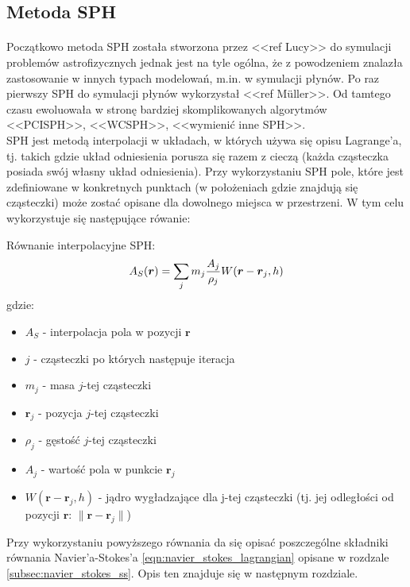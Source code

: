 \subsection{Metoda SPH}
\paragraph{}
Początkowo metoda SPH została stworzona przez <<ref Lucy>> do symulacji problemów astrofizycznych jednak jest na tyle ogólna, że z powodzeniem znalazła zastosowanie w innych typach modelowań, m.in. w symulacji płynów. Po raz pierwszy SPH do symulacji płynów wykorzystał <<ref Müller>>. Od tamtego czasu ewoluowała w stronę bardziej skomplikowanych algorytmów <<PCISPH>>, <<WCSPH>>, <<wymienić inne SPH>>.\\
SPH jest metodą interpolacji w układach, w których używa się opisu Lagrange'a, tj. takich gdzie układ odniesienia porusza się razem z cieczą (każda cząsteczka posiada swój własny układ odniesienia). Przy wykorzystaniu SPH pole, które jest zdefiniowane w konkretnych punktach (w położeniach gdzie znajdują się cząsteczki) może zostać opisane dla dowolnego miejsca w przestrzeni. W tym celu wykorzystuje się następujące rówanie:\\

\begin{samepage}
{\sc Równanie interpolacyjne SPH: }
\begin{equation}
A_S(\boldsymbol{r}) = \sum\limits_{j} m_j {A_j \over\rho_j}W(\boldsymbol{r}-\boldsymbol{r}_j, h)
\label{eqn:sph}
\end{equation}
gdzie:

\begin{itemize}[noitemsep,topsep=0pt,parsep=0pt,partopsep=0pt]
\renewcommand\labelitemi{--}
\item $ A_S $ - interpolacja pola w pozycji $\boldsymbol{r}$
\item $j$ - cząsteczki po których następuje iteracja
\item $m_j$ - masa $j$-tej cząsteczki
\item $\boldsymbol{r}_j$ - pozycja $j$-tej cząsteczki
\item $\rho_j$ - gęstość $j$-tej cząsteczki
\item $A_j$ - wartość pola w punkcie $\boldsymbol{r}_j$
\item $W(\boldsymbol{r}-\boldsymbol{r}_j, h)$ - jądro wygładzające dla j-tej cząsteczki (tj. jej odległości od pozycji $\boldsymbol{r}$: $\| \boldsymbol{r}-\boldsymbol{r}_j \|$)
\end{itemize}
\end{samepage}
\vspace{3ex}
Przy wykorzystaniu powyższego równania da się opisać poszczególne składniki równania Navier'a-Stokes'a \eqref{eqn:navier_stokes_lagrangian} opisane w rozdzale \eqref{subsec:navier_stokes_ss}. Opis ten znajduje się w następnym rozdziale.
\par

